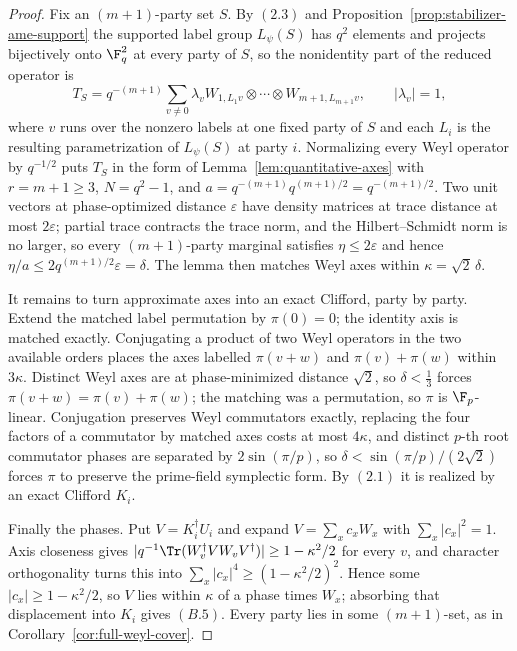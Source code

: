 \begin{proof}
Fix an \((m+1)\)-party set \(S\).  By \((2.3)\) and
Proposition~\ref{prop:stabilizer-ame-support} the supported label group
\(L_\psi(S)\) has \(q^2\) elements and projects bijectively onto
\(\F_q^2\) at every party of \(S\), so the nonidentity part of the reduced
operator is
\[
 T_S=q^{-(m+1)}\sum_{v\ne0}\lambda_v
   W_{1,L_1v}\otimes\cdots\otimes W_{m+1,L_{m+1}v},
 \qquad\lvert\lambda_v\rvert=1,
\]
where \(v\) runs over the nonzero labels at one fixed party of \(S\) and
each \(L_i\) is the resulting parametrization of \(L_\psi(S)\) at party
\(i\).  Normalizing every Weyl operator by \(q^{-1/2}\) puts \(T_S\) in the
form of Lemma~\ref{lem:quantitative-axes} with
\(r=m+1\geq3\), \(N=q^2-1\), and
\(a=q^{-(m+1)}q^{(m+1)/2}=q^{-(m+1)/2}\).  Two
unit vectors at phase-optimized distance \(\varepsilon\) have density
matrices at trace distance at most \(2\varepsilon\); partial trace
contracts the trace norm, and the Hilbert--Schmidt norm is no larger, so
every \((m+1)\)-party marginal satisfies \(\eta\leq2\varepsilon\) and hence
\(\eta/a\leq2q^{(m+1)/2}\varepsilon=\delta\).  The lemma then matches Weyl
axes within \(\kappa=\sqrt2\,\delta\).

It remains to turn approximate axes into an exact Clifford, party by party.
Extend the matched label permutation by \(\pi(0)=0\); the identity axis is
matched exactly.  Conjugating a product of two Weyl operators in the two
available orders places the axes labelled \(\pi(v+w)\) and
\(\pi(v)+\pi(w)\) within \(3\kappa\).  Distinct Weyl axes are at
phase-minimized distance \(\sqrt2\), so \(\delta<\frac13\) forces
\(\pi(v+w)=\pi(v)+\pi(w)\); the matching was a permutation, so \(\pi\) is
\(\F_p\)-linear.  Conjugation preserves Weyl commutators exactly, replacing
the four factors of a commutator by matched axes costs at most
\(4\kappa\), and distinct \(p\)-th root commutator phases are separated by
\(2\sin(\pi/p)\), so \(\delta<\sin(\pi/p)/(2\sqrt2)\) forces \(\pi\) to
preserve the prime-field symplectic form.  By \((2.1)\) it is realized by
an exact Clifford \(K_i\).

Finally the phases.  Put \(V=K_i^\dagger U_i\) and expand
\(V=\sum_xc_xW_x\) with \(\sum_x\lvert c_x\rvert^2=1\).  Axis closeness
gives \(\lvert q^{-1}\Tr(W_v^\dagger VW_vV^\dagger)\rvert\geq
1-\kappa^2/2\) for every \(v\), and character orthogonality turns this into
\(\sum_x\lvert c_x\rvert^4\geq(1-\kappa^2/2)^2\).  Hence some
\(\lvert c_x\rvert\geq1-\kappa^2/2\), so \(V\) lies within \(\kappa\) of a
phase times \(W_x\); absorbing that displacement into \(K_i\) gives
\((B.5)\).  Every party lies in some \((m+1)\)-set, as in
Corollary~\ref{cor:full-weyl-cover}.
\end{proof}

